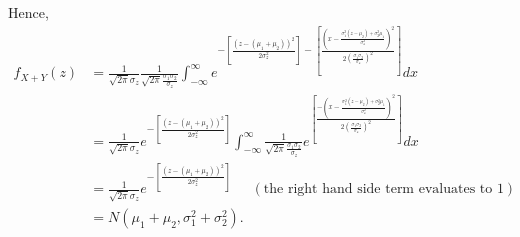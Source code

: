 \documentclass{article}
\begin{document}
Hence,  
\begin{align}
    f_{X+Y}(z) & = \frac{1}{\sqrt{2\pi}\sigma_z}\frac{1}{\sqrt{2\pi}\frac{\sigma_1\sigma_2}{\sigma_z}}\int_{-\infty}^{\infty}e^{-\left[\frac{(z-(\mu_1+\mu_2))^2}{2\sigma_z^2}\right]-\left[\frac{\left(x-\frac{\sigma_1^2(z-\mu_2)+\sigma_2^2\mu_1}{\sigma_z^2}\right)^2}{2\left(\frac{\sigma_1\sigma_2}{\sigma_z}\right)^2}\right]}dx \\
    & = \frac{1}{\sqrt{2\pi}\sigma_z}e^{-\left[\frac{(z-(\mu_1+\mu_2))^2}{2\sigma_z^2}\right]}\int_{-\infty}^{\infty}\frac{1}{\sqrt{2\pi}\frac{\sigma_1\sigma_2}{\sigma_z}}e^{\left[\frac{-\left(x-\frac{\sigma_1^2(z-\mu_2)+\sigma_2^2\mu_1}{\sigma_z^2}\right)^2}{2\left(\frac{\sigma_1\sigma_2}{\sigma_z}\right)^2}\right]}dx \\
    & = \frac{1}{\sqrt{2\pi}\sigma_z}e^{-\left[\frac{(z-(\mu_1+\mu_2))^2}{2\sigma_z^2}\right]} \;\;\;\;\; (\text{the right hand side term evaluates to 1}) \\
    & = N(\mu_1+\mu_2,\sigma_1^2+\sigma_2^2).
\end{align}
\end{document}
